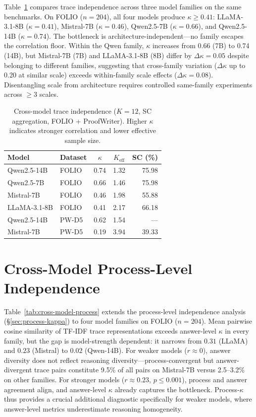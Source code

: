 Table~\ref{tab:cross_model_kappa} compares trace independence across three model families on the same benchmarks. On FOLIO ($n = 204$), all four models produce $\kappa \geq 0.41$: LLaMA-3.1-8B ($\kappa = 0.41$), Mistral-7B ($\kappa = 0.46$), Qwen2.5-7B ($\kappa = 0.66$), and Qwen2.5-14B ($\kappa = 0.74$). The bottleneck is architecture-independent---no family escapes the correlation floor. Within the Qwen family, $\kappa$ increases from 0.66 (7B) to 0.74 (14B), but Mistral-7B (7B) and LLaMA-3.1-8B (8B) differ by $\Delta\kappa = 0.05$ despite belonging to different families, suggesting that cross-family variation ($\Delta\kappa$ up to 0.20 at similar scale) exceeds within-family scale effects ($\Delta\kappa = 0.08$). Disentangling scale from architecture requires controlled same-family experiments across $\geq$3 scales.

\begin{table}[h]
\centering
\small
\caption{Cross-model trace independence ($K = 12$, SC aggregation, FOLIO + ProofWriter). Higher $\kappa$ indicates stronger correlation and lower effective sample size.}
\label{tab:cross_model_kappa}
\begin{tabular}{@{}llccr@{}}
\toprule
Model & Dataset & $\kappa$ & $K_{\text{eff}}$ & SC (\%) \\
\midrule
Qwen2.5-14B & FOLIO & 0.74 & 1.32 & 75.98 \\
Qwen2.5-7B & FOLIO & 0.66 & 1.46 & 75.98 \\
Mistral-7B & FOLIO & 0.46 & 1.98 & 55.88 \\
LLaMA-3.1-8B & FOLIO & 0.41 & 2.17 & 66.18 \\
\addlinespace
Qwen2.5-14B & PW-D5 & 0.62 & 1.54 & --- \\
Mistral-7B & PW-D5 & 0.19 & 3.94 & 39.33 \\
\bottomrule
\end{tabular}
\end{table}


\section{Cross-Model Process-Level Independence}
\label{app:cross-model-process}

Table~\ref{tab:cross-model-process} extends the process-level independence analysis (\S\ref{sec:process-kappa}) to four model families on FOLIO ($n = 204$). Mean pairwise cosine similarity of TF-IDF trace representations exceeds answer-level $\kappa$ in every family, but the gap is model-strength dependent: it narrows from $0.31$ (LLaMA) and $0.23$ (Mistral) to $0.02$ (Qwen-14B). For weaker models ($r \approx 0$), answer diversity does not reflect reasoning diversity---process-convergent but answer-divergent trace pairs constitute 9.5\% of all pairs on Mistral-7B versus 2.5--3.2\% on other families. For stronger models ($r \approx 0.23$, $p \leq 0.001$), process and answer agreement align, and answer-level $\kappa$ already captures the bottleneck. Process-$\kappa$ thus provides a crucial additional diagnostic specifically for weaker models, where answer-level metrics underestimate reasoning homogeneity.

